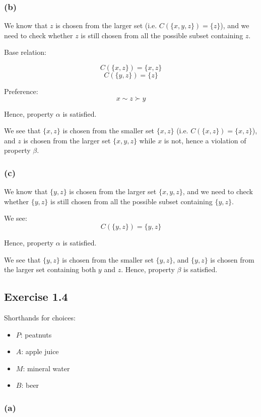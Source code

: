 \documentclass[a4paper]{article}
\begin{document}
\subsubsection*{(b)}

We know that $z$ is chosen from the larger set (i.e. $C(\{x,y,z\})=\{z\}$), and we need to check whether $z$ is still chosen from all the possible subset containing $z$.

Base relation:

\[C(\{x,z\})=\{x,z\} \]
\[C(\{y,z\})=\{z\} \]

Preference:
\[x\sim z \succ y \]

Hence, property $\alpha$ is satisfied.

We see that $\{x,z\}$ is chosen from the smaller set $\{x,z\}$ (i.e. $C(\{x,z\})=\{x,z\}$), and $z$ is chosen from the larger set $\{x,y,z\}$ while $x$ is not, hence a violation of property $\beta$.

\subsubsection*{(c)}

We know that $\{y,z\}$ is chosen from the larger set $\{x,y,z\}$, and we need to check whether $\{y,z\}$ is still chosen from all the possible subset containing $\{y,z\}$.

We see:
\[C(\{y,z\})=\{y,z\} \]

Hence, property $\alpha$ is satisfied.

We see that $\{y,z\}$ is chosen from the smaller set $\{y,z\}$, and $\{y,z\}$ is chosen from the larger set containing both $y$ and $z$. Hence, property $\beta$ is satisfied.


\subsection*{Exercise 1.4}

Shorthands for choices:
\begin{itemize}
    \item $P$: peatnuts
    \item $A$: apple juice
    \item $M$: mineral water
    \item $B$: beer
\end{itemize}

\subsubsection*{(a)}
\end{document}
